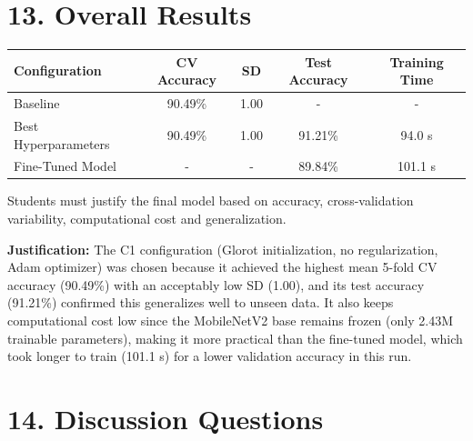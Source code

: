 \documentclass[10pt]{article}
\begin{document}
\section*{13. Overall Results}

\begin{center}
\begin{tabular}{|l|c|c|c|c|}
\hline
Configuration & CV Accuracy & SD & Test Accuracy & Training Time\\
\hline
Baseline & 90.49\% & 1.00 & - & -\\
Best Hyperparameters & 90.49\% & 1.00 & 91.21\% & 94.0 s\\
Fine-Tuned Model & - & - & 89.84\% & 101.1 s\\
\hline
\end{tabular}
\end{center}

Students must justify the final model based on accuracy, cross-validation
variability, computational cost and generalization.

\textbf{Justification:} The C1 configuration (Glorot initialization, no
regularization, Adam optimizer) was chosen because it achieved the highest mean
5-fold CV accuracy (90.49\%) with an acceptably low SD (1.00), and its test
accuracy (91.21\%) confirmed this generalizes well to unseen data. It also keeps
computational cost low since the MobileNetV2 base remains frozen (only 2.43M
trainable parameters), making it more practical than the fine-tuned model, which
took longer to train (101.1 s) for a lower validation accuracy in this run.

\section*{14. Discussion Questions}
\end{document}
